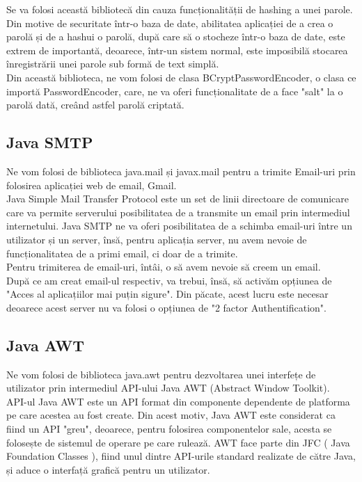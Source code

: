 \documentclass{article}
\begin{document}
Se va folosi această bibliotecă din cauza funcționalității de hashing a unei parole. Din motive de securitate într-o baza de date, abilitatea aplicației de a crea o parolă și de a hashui o parolă, după care să o stocheze într-o baza de date, este extrem de importantă, deoarece, într-un sistem normal, este imposibilă stocarea înregistrării unei parole sub formă de text simplă. \\

Din această biblioteca, ne vom folosi de clasa BCryptPasswordEncoder, o clasa ce importă PasswordEncoder, care, ne va oferi funcționalitate de a face "salt" la o parolă dată, creând astfel parolă criptată.

		\subsection{Java SMTP}

		Ne vom folosi de biblioteca java.mail și javax.mail pentru a trimite Email-uri prin folosirea aplicației web de email, Gmail. \\

Java Simple Mail Transfer Protocol este un set de linii directoare de comunicare care va permite serverului posibilitatea de a transmite un email prin intermediul internetului. Java SMTP ne va oferi posibilitatea de a schimba email-uri între un utilizator și un server, însă, pentru aplicația server, nu avem nevoie de funcționalitatea de a primi email, ci doar de a trimite. \\

Pentru trimiterea de email-uri, întâi, o să avem nevoie să creem un email. \\

După ce am creat email-ul respectiv, va trebui, însă, să activăm opțiunea de "Acces al aplicațiilor mai puțin sigure". Din păcate, acest lucru este necesar deoarece acest server nu va folosi o opțiunea de "2 factor Authentification". 

		\subsection {Java AWT}
		\vspace{0.3cm}
		Ne vom folosi de biblioteca java.awt pentru dezvoltarea unei interfețe de utilizator prin intermediul API-ului Java AWT (Abstract Window Toolkit). \\
		API-ul Java AWT este un API format din componente dependente de platforma pe care acestea au fost create. Din acest motiv, Java AWT este considerat ca fiind un API "greu", deoarece, pentru folosirea componentelor sale, acesta se folosește de sistemul de operare pe care rulează. AWT face parte din JFC ( Java Foundation Classes ), fiind unul dintre API-urile standard realizate de către Java, și aduce o interfață grafică pentru un utilizator.\\ 
\end{document}
